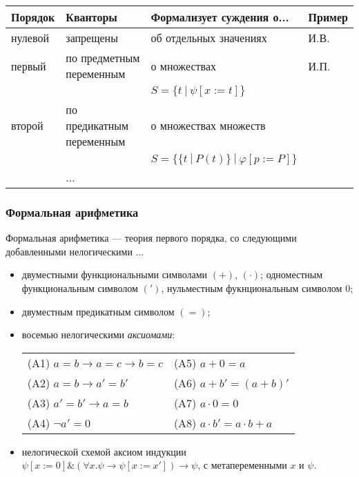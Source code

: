 \begin{tabular}{llll}
Порядок & Кванторы & Формализует суждения о... & Пример\\\hline
нулевой & запрещены & об отдельных значениях & И.В.\\
первый & по предметным переменным & о множествах & И.П.\\
    &   & $S = \{ t\ |\ \psi[x := t] \}$ \\
второй & по предикатным переменным & о множествах множеств \\
    &   & $S = \{ \{t\ |\ P(t)\}\ |\ \varphi[p := P] \}$ \\
    & ...
\end{tabular}


\subsubsection{Формальная арифметика}
\begin{definition}
Формальная арифметика --- теория первого порядка, со следующими добавленными нелогическими ...
\begin{itemize}
\item двуместными функциональными символами $(+)$, $(\cdot)$; одноместным функциональным символом $(')$,
нульместным фукнциональным символом $0$;
\item двуместным предикатным символом $(=)$;
\item восемью нелогическими \emph{аксиомами}:\vspace{0.1cm}
\begin{tabular}{ll}
(A1) $a=b \to a=c \to b=c$             &(A5) $a+0 = a$                     \\
(A2) $a=b \to a'=b'$                   &(A6) $a+b' = (a+b)'$               \\
(A3) $a'=b' \to a=b$                   &(A7) $a\cdot 0 = 0$                \\
(A4) $\neg a' = 0$                     &(A8) $a\cdot b' = a \cdot b + a$
\end{tabular}
\item нелогической схемой аксиом индукции $\psi[x:=0]\&(\forall x.\psi\to \psi[x:=x'])\to \psi$, с метапеременными $x$ и $\psi$.
\end{itemize}
\end{definition}


